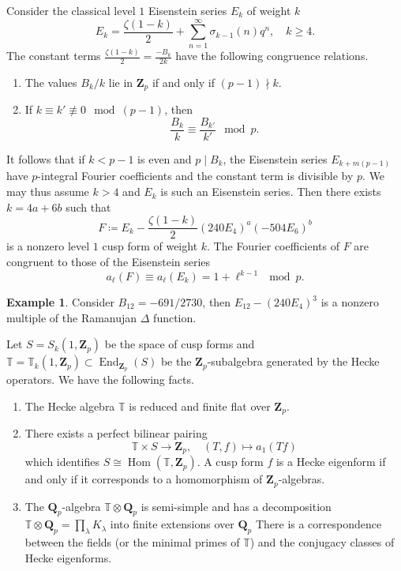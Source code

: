 \documentclass[11pt]{amsart}
\newcommand{\Q}{\mathbf{Q}}  %
\newcommand{\Z}{\mathbf{Z}}  %
\newcommand{\Hom}{\operatorname{Hom}}
\newcommand{\End}{\operatorname{End}}
\theoremstyle{definition}
\theoremstyle{definition}
\theoremstyle{definition}
\theoremstyle{definition}
\theoremstyle{definition}
\newtheorem{example}[definition]{Example}
\theoremstyle{definition}
\begin{document}
Consider the classical level $1$ Eisenstein series $E_k$ of weight $k$
\begin{equation*}
    E_k=\frac{\zeta(1-k)}{2}+\sum_{n=1}^\infty \sigma_{k-1}(n)q^n,\quad k\geq 4.
\end{equation*}
The constant terms $\frac{\zeta(1-k)}{2}=\frac{-B_k}{2k}$
have the following congruence relations.
\begin{enumerate}
    \item The values $B_k/k$ lie in $\Z_p$ if and only if $(p-1)\nmid k$.
    \item If $k\equiv k'\not\equiv 0\mod (p-1)$, then
    \begin{equation*}
        \frac{B_k}{k}\equiv \frac{B_{k'}}{k'}\mod p.
    \end{equation*}
\end{enumerate}
It follows that if $k<p-1$ is even and $p\mid B_k$,
the Eisenstein series $E_{k+m(p-1)}$
have $p$-integral Fourier coefficients and the constant term is 
divisible by $p$. We may thus assume $k>4$ and $E_k$
is such an Eisenstein series.
Then there exists $k=4a+6b$
such that
\begin{equation*}
    F \coloneqq 
    E_k-\frac{\zeta(1-k)}{2}(240E_4)^a(-504E_6)^b
\end{equation*}
is a nonzero level $1$ cusp form of weight $k$.
The Fourier coefficients of $F$ are congruent to those of the Eisenstein series
\begin{equation*}
    a_\ell(F) \equiv a_\ell(E_k)=1+\ell^{k-1}\mod p.
\end{equation*}
\begin{example}
    Consider $B_{12}=-691/2730$, then
    $E_{12}-(240E_4)^3$ is a nonzero multiple of the
    Ramanujan $\Delta$ function.
\end{example}

Let $S=S_k(1,\Z_p)$ be the space of cusp forms
and $\mathbb{T}=\mathbb{T}_k(1,\Z_p)\subset \End_{\Z_p}(S)$
be the $\Z_p$-subalgebra generated by the Hecke operators. We have the following facts.
\begin{enumerate}
    \item The Hecke algebra $\mathbb{T}$ is reduced and finite flat over $\Z_p$.
    \item There exists a perfect bilinear pairing
    \begin{equation*}
        \mathbb{T}\times S\to \Z_p,
        \quad (T, f)\mapsto a_1(Tf)
    \end{equation*}
    which identifies $S\cong \Hom(\mathbb{T},\Z_p)$.
    A cusp form $f$ is a Hecke eigenform if and only if it corresponds to a
    homomorphism of $\Z_p$-algebras.
    \item The $\Q_p$-algebra $\mathbb{T}\otimes \Q_p$ is semi-simple and 
    has a decomposition $\mathbb{T}\otimes \Q_p=\prod_\lambda K_\lambda$
    into finite extensions over $\Q_p$
    There is a correspondence between the fields (or the minimal primes of $\mathbb{T}$)
    and the conjugacy classes of Hecke eigenforms.
\end{enumerate}
\end{document}
